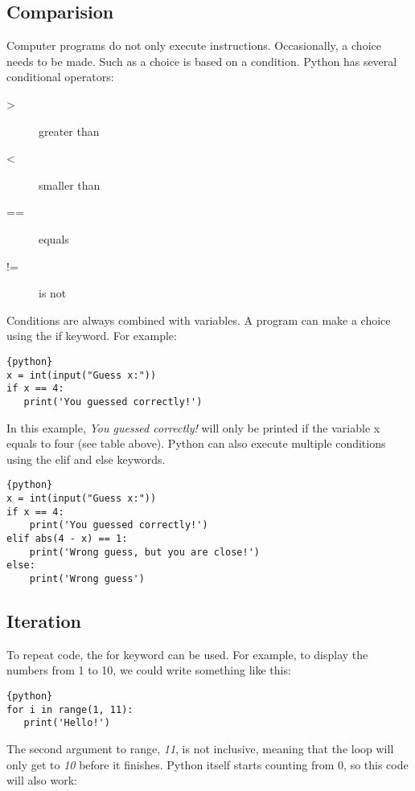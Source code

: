 \subsection{Comparision}\label{comparision}

Computer programs do not only execute instructions. Occasionally, a
choice needs to be made. Such as a choice is based on a condition.
Python has several conditional operators:

\begin{description}
\item[>]   greater than
\item[<]   smaller than
\item[==]  equals
\item[!=]  is not
\end{description}

Conditions are always combined with variables. A program can make a
choice using the if keyword. For example:

\begin{lstlisting}{python}
x = int(input("Guess x:"))
if x == 4:
   print('You guessed correctly!')
\end{lstlisting}

In this example, \emph{You guessed correctly!} will only be printed if
the variable x equals to four (see table above). Python can also execute
multiple conditions using the elif and else keywords.

\begin{lstlisting}{python}
x = int(input("Guess x:"))
if x == 4:
    print('You guessed correctly!')
elif abs(4 - x) == 1:
    print('Wrong guess, but you are close!')
else:
    print('Wrong guess')
\end{lstlisting}

\subsection{Iteration}\label{iteration}

To repeat code, the for keyword can be used. For example, to display the
numbers from 1 to 10, we could write something like this:

\begin{lstlisting}{python}
for i in range(1, 11):
   print('Hello!')
\end{lstlisting}

The second argument to range, \emph{11}, is not inclusive, meaning that
the loop will only get to \emph{10} before it finishes. Python itself
starts counting from 0, so this code will also work:

